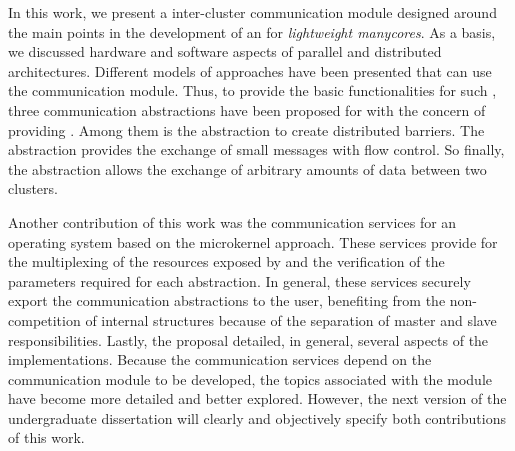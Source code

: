 In this work, we present a inter-cluster communication module
designed around the main points in the development of an \os for \textit{lightweight manycores}.
As a basis, we discussed hardware and software aspects of parallel
and distributed architectures.
Different models of \os approaches have been presented that can
use the communication module.
Thus, to provide the basic functionalities for such \oses, three
communication abstractions have been proposed for \hal with the
concern of providing \qos.
Among them is the \sync abstraction to create distributed barriers.
The \mailbox abstraction provides the exchange of small messages
with flow control.
So finally, the \portal abstraction allows the exchange of
arbitrary amounts of data between two clusters.

Another contribution of this work was the communication services
for an operating system based on the microkernel approach.
These services provide for the multiplexing of the resources
exposed by \hal and the verification of the parameters required
for each abstraction.
In general, these services securely export the communication
abstractions to the user, benefiting from the non-competition
of \os internal structures because of the separation of master
and slave responsibilities.
Lastly, the proposal detailed, in general, several aspects of
the implementations.
Because the communication services depend on the \hal communication
module to be developed, the topics associated with
the module have become more detailed and better explored.
However, the next version of the undergraduate dissertation
will clearly and objectively specify both contributions of this work.
